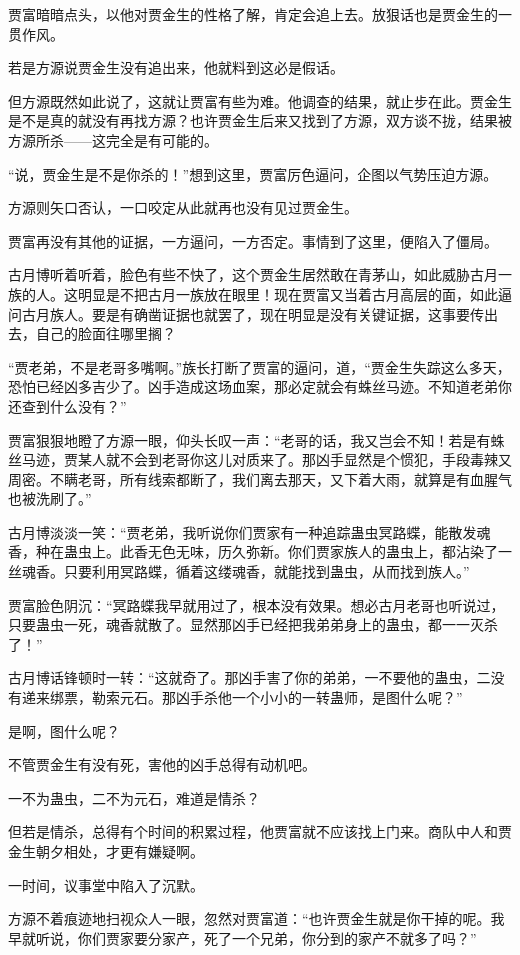 \begin{this_body}
贾富暗暗点头，以他对贾金生的性格了解，肯定会追上去。放狠话也是贾金生的一贯作风。

若是方源说贾金生没有追出来，他就料到这必是假话。

但方源既然如此说了，这就让贾富有些为难。他调查的结果，就止步在此。贾金生是不是真的就没有再找方源？也许贾金生后来又找到了方源，双方谈不拢，结果被方源所杀——这完全是有可能的。

“说，贾金生是不是你杀的！”想到这里，贾富厉色逼问，企图以气势压迫方源。

方源则矢口否认，一口咬定从此就再也没有见过贾金生。

贾富再没有其他的证据，一方逼问，一方否定。事情到了这里，便陷入了僵局。

古月博听着听着，脸色有些不快了，这个贾金生居然敢在青茅山，如此威胁古月一族的人。这明显是不把古月一族放在眼里！现在贾富又当着古月高层的面，如此逼问古月族人。要是有确凿证据也就罢了，现在明显是没有关键证据，这事要传出去，自己的脸面往哪里搁？

“贾老弟，不是老哥多嘴啊。”族长打断了贾富的逼问，道，“贾金生失踪这么多天，恐怕已经凶多吉少了。凶手造成这场血案，那必定就会有蛛丝马迹。不知道老弟你还查到什么没有？”

贾富狠狠地瞪了方源一眼，仰头长叹一声：“老哥的话，我又岂会不知！若是有蛛丝马迹，贾某人就不会到老哥你这儿对质来了。那凶手显然是个惯犯，手段毒辣又周密。不瞒老哥，所有线索都断了，我们离去那天，又下着大雨，就算是有血腥气也被洗刷了。”

古月博淡淡一笑：“贾老弟，我听说你们贾家有一种追踪蛊虫冥路蝶，能散发魂香，种在蛊虫上。此香无色无味，历久弥新。你们贾家族人的蛊虫上，都沾染了一丝魂香。只要利用冥路蝶，循着这缕魂香，就能找到蛊虫，从而找到族人。”

贾富脸色阴沉：“冥路蝶我早就用过了，根本没有效果。想必古月老哥也听说过，只要蛊虫一死，魂香就散了。显然那凶手已经把我弟弟身上的蛊虫，都一一灭杀了！”

古月博话锋顿时一转：“这就奇了。那凶手害了你的弟弟，一不要他的蛊虫，二没有递来绑票，勒索元石。那凶手杀他一个小小的一转蛊师，是图什么呢？”

是啊，图什么呢？

不管贾金生有没有死，害他的凶手总得有动机吧。

一不为蛊虫，二不为元石，难道是情杀？

但若是情杀，总得有个时间的积累过程，他贾富就不应该找上门来。商队中人和贾金生朝夕相处，才更有嫌疑啊。

一时间，议事堂中陷入了沉默。

方源不着痕迹地扫视众人一眼，忽然对贾富道：“也许贾金生就是你干掉的呢。我早就听说，你们贾家要分家产，死了一个兄弟，你分到的家产不就多了吗？”


\end{this_body}
